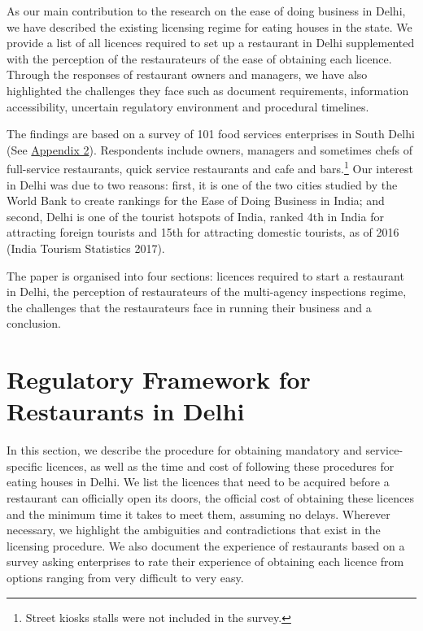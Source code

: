 \documentclass[a4paper, 12pt]{article}
\begin{document}
                    As our main contribution to the research on the ease of doing business in Delhi, we have described the existing licensing regime for eating houses in the state. We provide a list of all licences required to set up a restaurant in Delhi supplemented with 
the perception of the restaurateurs of the ease of obtaining each licence. Through the responses of restaurant owners and managers, we have also highlighted the challenges they face such as document requirements, information accessibility, uncertain regulatory 
environment and procedural timelines.
                    
                    The findings are based on a survey of 101 food services enterprises in South Delhi (See \hyperref[Appendix 2]{Appendix 2}). Respondents include owners, managers and sometimes chefs of full-service restaurants, quick service restaurants and cafe 
and bars.\footnote{Street kiosks stalls were not included in the survey.} Our interest in Delhi was due to two reasons: first, it is one of the two cities studied by the World Bank to create rankings for the Ease of Doing Business in India; and second, Delhi is one of the 
tourist hotspots of India, ranked 4th in India for attracting foreign tourists and 15th for attracting domestic tourists, as of 2016 (India Tourism Statistics 2017).
                    
                    The paper is organised into four sections: licences required to start a restaurant in Delhi, the perception of restaurateurs of the multi-agency inspections regime, the challenges that the restaurateurs face in running their business and a conclusion. 
            
                                        
                    \section{Regulatory Framework for Restaurants in Delhi}
                    \label{sec:1}
                    In this section, we describe the procedure for obtaining mandatory and service-specific licences, as well as the time and cost of following these procedures for eating houses in Delhi. We list the licences that need to be acquired before a restaurant can 
officially open its doors, the official cost of obtaining these licences and the minimum time it takes to meet them, assuming no delays. Wherever necessary, we highlight the ambiguities and contradictions that exist in the licensing procedure. We also document the 
experience of restaurants based on a survey asking enterprises to rate their experience of obtaining each licence from options ranging from very difficult to very easy.
                                   
\end{document}
